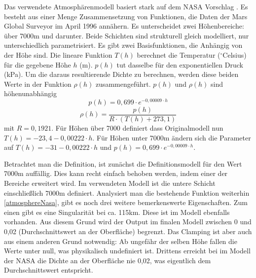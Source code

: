 Das verwendete Atmosphärenmodell basiert stark auf dem NASA Vorschlag \cite{Hall2015}. Es besteht aus einer Menge Zusammensetzung von Funktionen, die Daten der Mars Global Surveyor im April 1996 annähern. Es unterscheidet zwei Höhenbereiche: über 7000m und darunter. Beide Schichten sind strukturell gleich modelliert, nur unterschiedlich parametrisiert. Es gibt zwei Basisfunktionen, die Anhängig von der Höhe sind. Die lineare Funktion $T(h)$ berechnet die Temperatur ($^{\circ}$Celsius) für die gegebene Höhe $h$ (m). $p(h)$ tut dasselbe für den exponentiellen Druck (kPa). Um die daraus resultierende Dichte zu berechnen, werden diese beiden Werte in der Funktion $\rho(h)$ zusammengeführt. $p(h)$ und $\rho(h)$ sind höhenunabhängig
$$ p(h) = 0,699 \cdot e^{-0,00009 \cdot h}$$
$$ \rho(h) =  \frac{p(h)}{R \cdot (T(h) + 273,1)} $$
mit $ R = 0,1921 $. Für Höhen über 7000 definiert dass Originalmodell nun $ T(h) = -23,4 - 0,00222 \cdot h $. Für Höhen unter 7000m ändern sich die Parameter auf $ T(h) = -31 - 0,00222 \cdot h $ und $ p(h) = 0,699 \cdot e^{-0,00009 \cdot h}$.

Betrachtet man die Definition, ist zunächst die Definitionsmodell für den Wert 7000m auffällig. Dies kann recht einfach behoben werden, indem einer der Bereiche erweitert wird. Im verwendeten Modell ist die untere Schicht einschließlich 7000m definiert. Analysiert man die bestehende Funktion weiterhin \ref{atmosphereNasa}, gibt es noch drei weitere bemerkenswerte Eigenschaften.
Zum einen gibt es eine Singularität bei ca. 115km. Diese ist im Modell ebenfalls vorhanden. Aus diesem Grund wird der Output im finalen Modell zwischen 0 und 0,02 (Durchschnittswert an der Oberfläche)\cite{NASA2016} begrenzt. Das Clamping ist aber auch aus einem anderen Grund notwendig: Ab ungefähr der selben Höhe fallen die Werte unter null, was physikalisch undefiniert ist. Drittens erreicht bei im Modell der NASA die Dichte an der Oberfläche nie 0,02, was eigentlich dem Durchschnittswert entspricht.